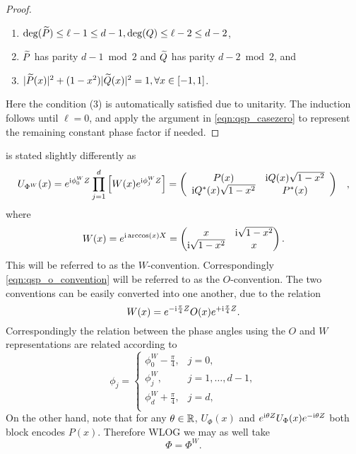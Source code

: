 \begin{proof}
\begin{enumerate}
\item $\deg(\widetilde{P}) \leq \ell-1\le d-1, \deg(Q) \leq \ell-2\le d-2$,

\item $\widetilde{P}$ has parity $d-1 \bmod 2$ and $\widetilde{Q}$ has parity $d-2 \bmod 2$, and

\item $|\widetilde{P}(x)|^2 + (1-x^2) |\widetilde{Q}(x)|^2 = 1, \forall x \in [-1, 1]$.
\end{enumerate}
Here the condition (3) is automatically satisfied due to unitarity.
The induction follows until $\ell=0$, and apply the argument in \cref{eqn:qsp_casezero} to represent the remaining constant phase factor if needed.
\end{proof}

\begin{rem}
\cite[Theorem 4]{GilyenSuLowEtAl2019} is stated slightly differently as
\begin{equation}
\begin{split}
        U_{\Phi^W}(x) &= e^{\mathrm{i} \phi^W_0 Z} \prod_{j=1}^{d} \left[ W(x) e^{\mathrm{i} \phi_j^W Z} \right] = \left( \begin{array}{cc}
        P(x) & \mathrm{i} Q(x) \sqrt{1 - x^2}\\
        \mathrm{i} Q^*(x) \sqrt{1 - x^2} & P^*(x)
        \end{array} \right)
\end{split},
\end{equation}
where
\begin{equation}
W(x)=e^{\mathrm{i} \arccos(x) X}=\begin{pmatrix}
x & \mathrm{i}\sqrt{1-x^2}\\
\mathrm{i}\sqrt{1-x^2} & x
\end{pmatrix}.
\end{equation}
This will be referred to as the $W$-convention. 
Correspondingly \cref{eqn:qsp_o_convention} will be referred to as the $O$-convention. The two conventions can be easily converted into one another, due to the relation
\begin{equation}
W(x)=e^{-\mathrm{i}\frac{\pi}{4}Z}O(x)e^{+\mathrm{i}\frac{\pi}{4}Z}.
\end{equation}
Correspondingly the relation between the phase angles using the $O$ and $W$ representations are related according to
\begin{equation}\label{eqn:phi_phi_W_convert}
\phi_j=\begin{cases}
\phi_0^W-\frac{\pi}{4},& j=0,\\
\phi_j^W, & j=1,\ldots,d-1,\\
\phi_d^W+\frac{\pi}{4},& j=d,\\
\end{cases}
\end{equation}
On the other hand, note that for any $\theta\in\mathbb{R}$, $U_{\Phi}(x)$ and $e^{\mathrm{i}\theta Z} U_{\Phi}(x) e^{-\mathrm{i}\theta Z}$ both block encodes $P(x)$. Therefore WLOG we may as well take 
\begin{equation}
\Phi=\Phi^W.
\end{equation}





\end{rem}
